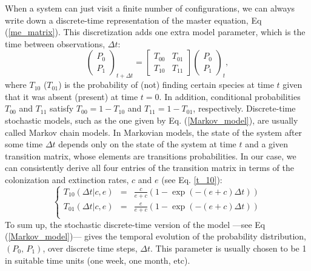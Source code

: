 \documentclass{article}
\begin{document}
When a system can just visit a finite number of configurations, we can always write down a discrete-time representation of the master equation, Eq (\ref{me_matrix}). This discretization adds one extra model parameter, which is the time between observations, $\Delta t$:
\begin{equation}
\label{Markov_model}
\left(
\begin{array}{c}
P_0 \\ 
P_1
\end{array}
\right)_{t+\Delta t} = \left[\begin{array}{cc}
T_{00} & T_{01} \\
T_{10} & T_{11}
\end{array} 
\right]
\left(
\begin{array}{c}
P_0 \\ 
P_1 
\end{array}
\right)_{t},
\end{equation}
where $T_{10}$ ($T_{01}$) is the probability of (not) finding certain species at time $t$ given that it was absent (present) at time $t=0$. In addition, conditional probabilities $T_{00}$ and $T_{11}$ satisfy $T_{00}=1-T_{10}$ and $T_{11}=1-T_{01}$, respectively. Discrete-time stochastic models, such as the one given by Eq. (\ref{Markov_model}), are usually called Markov chain models. In Markovian models, the state of the system after some time $\Delta t$ depends only on the state of the system at time $t$ and a given transition matrix, whose elements are transitions probabilities. In our case, we can consistently derive all four entries of the transition matrix in terms of the colonization and extinction rates, $c$ and $e$ (see Eq. \eqref{t_10}):
\begin{equation}
\label{T_00}
\left\{
\begin{array}{ccc}      
T_{10}(\Delta t| c, e) &=&  \frac{c}{e+c} ( 1 - \exp(-(e+c)\Delta t) )\\  
T_{01}(\Delta t| c, e) &=&  \frac{e}{e+c} ( 1 - \exp(-(e+c)\Delta t) )\\
\end{array}
\right.
\end{equation} 
To sum up, the stochastic discrete-time version of the model ---see Eq (\ref{Markov_model})--- gives the temporal evolution of the probability distribution, $(P_0,\, P_1)$, over discrete time steps, $\Delta t$. This parameter is usually chosen to be 1 in suitable time units (one week, one month, etc). 
\bigskip
\end{document}
